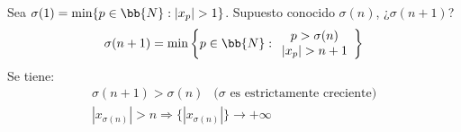 \documentclass[12pt]{article}
\begin{document}
\begin{ejercicio}[2 puntos]
\begin{enumerate}
            Sea $\sigma(1) = \min\{p\in \bb{N}: |x_p|>1\}$. Supuesto conocido $\sigma(n)$, ¿$\sigma(n+1)$?\\
            \begin{gather*}
                \sigma(n+1) = \min\left\{ p \in \bb{N} : \begin{array}{c}
                     p>\sigma(n)\\
                     |x_p|>n+1
                \end{array}\right\}
            \end{gather*}
            Se tiene:
            \begin{gather*}
                \sigma(n+1) > \sigma (n)\ \  \text{ ($\sigma$ es estrictamente creciente)}\\
                |x_{\sigma(n)}| > n \Longrightarrow \{|x_{\sigma(n)}|\}\longrightarrow +\infty
            \end{gather*}
        \end{enumerate}
    \end{ejercicio}
\end{document}
